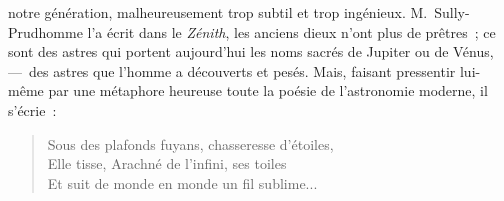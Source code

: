 \documentclass[french,twoside]{book} %
\begin{document}
notre génération, malheureusement trop subtil et trop ingénieux. M. Sully-Prudhomme l’a écrit dans le \emph{Zénith}, les anciens dieux n’ont plus de prêtres ; ce sont des astres qui portent aujourd’hui les noms sacrés de Jupiter ou de Vénus, — des astres que l’homme a découverts et pesés. Mais, faisant pressentir lui-même par une métaphore heureuse toute la poésie de l’astronomie moderne, il s’écrie :\par


\begin{verse}
Sous des plafonds fuyans, chasseresse d’étoiles,\\
Elle tisse, Arachné de l’infini, ses toiles\\
Et suit de monde en monde un fil sublime...\\
\end{verse}
\end{document}
